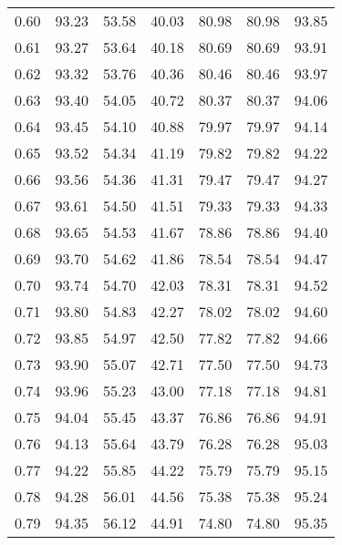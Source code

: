 \begin{tabular}{|c|c|c|c|c|c|c|}
      0.60 &     93.23 &     53.58 &      40.03 &   80.98 &      80.98 &         93.85 \\
      0.61 &     93.27 &     53.64 &      40.18 &   80.69 &      80.69 &         93.91 \\
      0.62 &     93.32 &     53.76 &      40.36 &   80.46 &      80.46 &         93.97 \\
      0.63 &     93.40 &     54.05 &      40.72 &   80.37 &      80.37 &         94.06 \\
      0.64 &     93.45 &     54.10 &      40.88 &   79.97 &      79.97 &         94.14 \\
      0.65 &     93.52 &     54.34 &      41.19 &   79.82 &      79.82 &         94.22 \\
      0.66 &     93.56 &     54.36 &      41.31 &   79.47 &      79.47 &         94.27 \\
      0.67 &     93.61 &     54.50 &      41.51 &   79.33 &      79.33 &         94.33 \\
      0.68 &     93.65 &     54.53 &      41.67 &   78.86 &      78.86 &         94.40 \\
      0.69 &     93.70 &     54.62 &      41.86 &   78.54 &      78.54 &         94.47 \\
      0.70 &     93.74 &     54.70 &      42.03 &   78.31 &      78.31 &         94.52 \\
      0.71 &     93.80 &     54.83 &      42.27 &   78.02 &      78.02 &         94.60 \\
      0.72 &     93.85 &     54.97 &      42.50 &   77.82 &      77.82 &         94.66 \\
      0.73 &     93.90 &     55.07 &      42.71 &   77.50 &      77.50 &         94.73 \\
      0.74 &     93.96 &     55.23 &      43.00 &   77.18 &      77.18 &         94.81 \\
      0.75 &     94.04 &     55.45 &      43.37 &   76.86 &      76.86 &         94.91 \\
      0.76 &     94.13 &     55.64 &      43.79 &   76.28 &      76.28 &         95.03 \\
      0.77 &     94.22 &     55.85 &      44.22 &   75.79 &      75.79 &         95.15 \\
      0.78 &     94.28 &     56.01 &      44.56 &   75.38 &      75.38 &         95.24 \\
      0.79 &     94.35 &     56.12 &      44.91 &   74.80 &      74.80 &         95.35 \\

\end{tabular}

